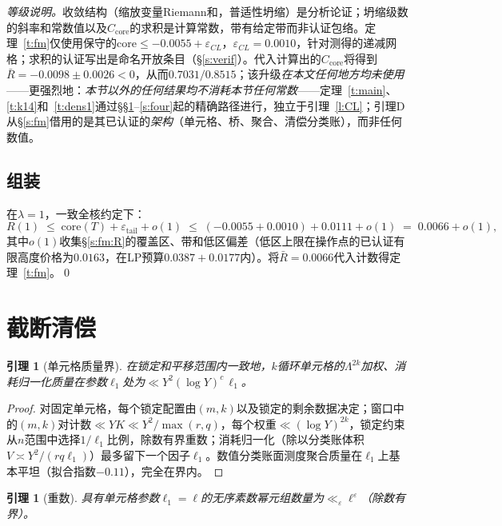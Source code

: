 \documentclass[11pt]{article}
\numberwithin{equation}{section}
\newtheorem{lemma}[theorem]{引理}
\theoremstyle{definition}
\theoremstyle{remark}
\newcommand{\LL}{\Lambda}
\begin{document}
\noindent\emph{等级说明。}收敛结构（缩放变量Riemann和，普适性坍缩）是分析论证；坍缩级数的斜率和常数值以及$C_{\mathrm{core}}$的求积是计算常数，带有给定带而非认证包络。定理~\ref{t:fm}仅使用保守的$\mathrm{core}\le-0.0055+\varepsilon_{CL}$，$\varepsilon_{CL}=0.0010$，针对测得的递减网格；求积的认证写出是命名开放条目（\S\ref{s:verif}）。代入计算出的$C_{\mathrm{core}}$将得到$\bar R=-0.0098\pm0.0026<0$，从而$0.7031/0.8515$；该升级\emph{在本文任何地方均未使用}——更强烈地：\emph{本节以外的任何结果均不消耗本节任何常数}——定理~\ref{t:main}、\ref{t:k14}和~\ref{t:dens1}通过\S\S\ref{s:trunc}--\ref{s:four}起的精确路径进行，独立于引理~\ref{l:CL}；引理D从\S\ref{s:fm}借用的是其已认证的\emph{架构}（单元格、桥、聚合、清偿分类账），而非任何数值。

\subsection{组装}\label{s:fm:assembly}

在$\lambda=1$，一致全核约定下：
\[
R(1)\;\le\;\mathrm{core}(T)+\varepsilon_{\mathrm{tail}}+o(1)
\;\le\;(-0.0055+0.0010)+0.0111+o(1)\;=\;0.0066+o(1),
\]
其中$o(1)$收集\S\ref{s:fm:R}的覆盖区、带和低区偏差（低区上限在操作点的已认证有限高度价格为$0.0163$，在LP预算$0.0387+0.0177$内）。将$\bar R=0.0066$代入计数得定理~\ref{t:fm}。\qed

\section{截断清偿}\label{s:trunc}

\begin{lemma}[单元格质量界]\label{l:mass}
在锁定和平移范围内一致地，$k$循环单元格的$\LL^{2k}$加权、消耗归一化质量在参数$\ell_1$处为$\ll Y^{2}(\log Y)^{c}\,\ell_1$。
\end{lemma}

\begin{proof}
对固定单元格，每个锁定配置由$(m,k)$以及锁定的剩余数据决定；窗口中的$(m,k)$对计数$\ll YK\ll Y^{2}/\max(r,q)$，每个权重$\ll(\log Y)^{2k}$，锁定约束从$n$范围中选择$1/\ell_1$比例，除数有界重数；消耗归一化（除以分类账体积$V\asymp Y^{2}/(rq\ell_1)$）最多留下一个因子$\ell_1$。数值分类账面测度聚合质量在$\ell_1$上基本平坦（拟合指数$-0.11$），完全在界内。
\end{proof}

\begin{lemma}[重数]\label{l:mult}
具有单元格参数$\ell_1=\ell$的无序素数幂元组数量为$\ll_{\varepsilon}\ell^{\varepsilon}$（除数有界）。
\end{lemma}
\end{document}
